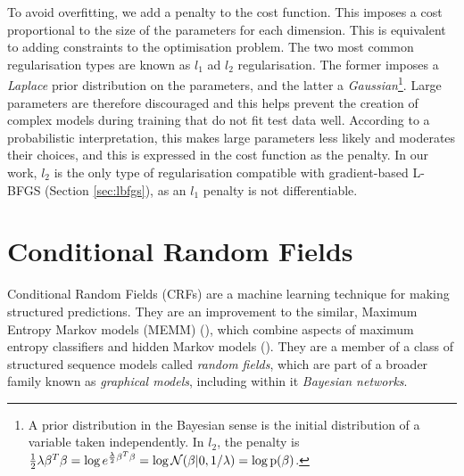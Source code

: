 To avoid overfitting, we add a penalty to the cost function. This imposes a cost proportional to the size of the parameters for each dimension. This is equivalent to adding constraints to the optimisation problem. The two most common regularisation types are known as $l_1$ ad $l_2$ regularisation. The former imposes a \emph{Laplace} prior distribution on the parameters, and the latter a \emph{Gaussian}\footnote{A prior distribution in the Bayesian sense is the initial distribution of a variable taken independently. In $l_2$, the penalty is $\frac{1}{2}\lambda\beta^T\beta = \log e^{\frac{\lambda}{2}\beta^T\beta} = \log \mathcal{N}(\beta|0, 1/\lambda) = \log\text{p}(\beta)$.}. Large parameters are therefore discouraged and this helps prevent the creation of complex models during training that do not fit test data well. According to a probabilistic interpretation, this makes large parameters less likely and moderates their choices, and this is expressed in the cost function as the penalty. In our work, $l_2$ is the only type of regularisation compatible with gradient-based L-BFGS (Section \ref{sec:lbfgs}), as an $l_1$ penalty is not differentiable.

\section{Conditional Random Fields}
\label{subsec:crfs}

Conditional Random Fields (CRFs) are a machine learning technique for making structured predictions. They are an improvement to the similar, Maximum Entropy Markov models (MEMM) (\cite{mccallum2000maximum}), which combine aspects of maximum entropy classifiers and hidden Markov models (\cite{lafferty2001conditional}). They are a member of a class of structured sequence models called \emph{random fields}, which are part of a broader family known as \emph{graphical models}, including within it \emph{Bayesian networks}.

